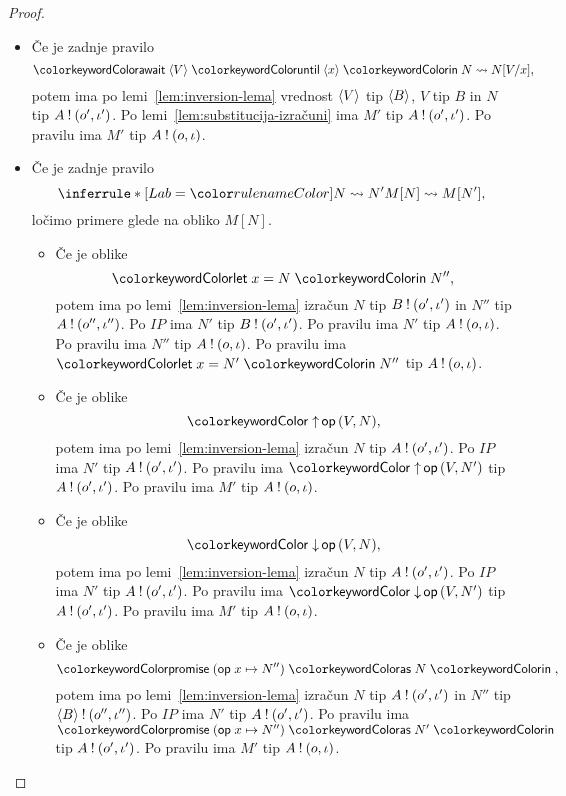 \begin{proof}
\begin{itemize}
		\item Če je zadnje pravilo $$\tmawait{\tmpromise V}{x}{N} \reduces N[V/x],$$ potem ima po lemi~\ref{lem:inversion-lema} vrednost $\langle V \rangle$ tip $\langle B \rangle$, $V$ tip $B$ in $N$ tip $A \mathbin{!} (o', \iota')$.
		Po lemi~\ref{lem:substitucija-izračuni} ima $M'$ tip $A \mathbin{!} (o', \iota')$.
		Po pravilu  ima $M'$ tip $A \mathbin{!} (o, \iota)$.
		
		
		
		
		\item Če je zadnje pravilo $$\coopinfer{}{
			N \reduces N'
		}{
			M[N] \reduces M[N']
		},$$
		ločimo primere glede na obliko $M[N]$.
		\begin{itemize}
			\item Če je oblike $$\tmlet{x}{N}{N''},$$ potem ima po lemi~\ref{lem:inversion-lema} izračun $N$ tip $B \mathbin{!} (o', \iota')$ in $N''$ tip $A \mathbin{!} (o'', \iota'')$.
			Po $IP$ ima $N'$ tip $B \mathbin{!} (o', \iota')$.
			Po pravilu  ima $N'$ tip $A \mathbin{!} (o, \iota)$.
			Po pravilu  ima $N''$ tip $A \mathbin{!} (o, \iota)$.
			Po pravilu  ima $\tmlet{x}{N'}{N''}$ tip $A \mathbin{!} (o, \iota)$.
			
			\item Če je oblike $$\tmopout{op}{V}{N},$$ potem ima po lemi~\ref{lem:inversion-lema} izračun $N$ tip $A \mathbin{!} (o', \iota')$.
			Po $IP$ ima $N'$ tip $A \mathbin{!} (o', \iota')$.
			Po pravilu  ima $\tmopout{op}{V}{N'}$ tip $A \mathbin{!} (o', \iota')$.
			Po pravilu  ima $M'$ tip $A \mathbin{!} (o, \iota)$.
			
			\item Če je oblike $$\tmopin{op}{V}{N},$$ potem ima po lemi~\ref{lem:inversion-lema} izračun $N$ tip $A \mathbin{!} (o', \iota')$.
			Po $IP$ ima $N'$ tip $A \mathbin{!} (o', \iota')$.
			Po pravilu  ima $\tmopin{op}{V}{N'}$ tip $A \mathbin{!} (o', \iota')$.
			Po pravilu  ima $M'$ tip $A \mathbin{!} (o, \iota)$.
			
			\item Če je oblike $$\tmwith{op}{x}{N''}{N},$$ potem ima po lemi~\ref{lem:inversion-lema} izračun $N$ tip $A \mathbin{!} (o', \iota')$ in $N''$ tip $\langle B \rangle \mathbin{!} (o'', \iota'')$.
			Po $IP$ ima $N'$ tip $A \mathbin{!} (o', \iota')$.
			Po pravilu  ima $\tmwith{op}{x}{N''}{N'}$ tip $A \mathbin{!} (o', \iota')$.
			Po pravilu  ima $M'$ tip $A \mathbin{!} (o, \iota)$.
		\end{itemize}

	\end{itemize}

\end{proof}


